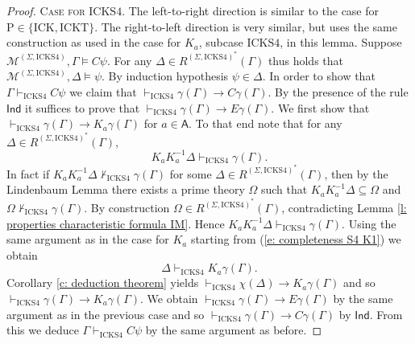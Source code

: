 \documentclass{myifcolog}
\newcommand\C {C}
\newcommand{\K}{K}
\newcommand\A{\mathsf{A}}
\newcommand{\agi}{a}
\newcommand{\E}{E}
\newcommand{\fw}{\mathcal{M}}
\newcommand{\hick}{\mathrm{ICK}}
\newcommand{\hickt}{\mathrm{ICKT}}
\newcommand{\hicks}{\mathrm{ICKS4}}
\newcommand{\hickp}{\mathrm{P}}
\numberwithin{theorem}{section}
\begin{document}
\begin{proof}
   \noindent \textsc{Case for $\hicks$.} The left-to-right direction is similar to the case for $\hickp \in \{\hick, \hickt\}$. The right-to-left direction is very similar, but uses the same construction as used in the case for $\K_\agi$, subcase $\hicks$, in this lemma. Suppose $\fw^{(\Sigma, \hicks)}, \Gamma \models \C \psi$. For any $\Delta \in R^{(\Sigma, \hicks)^*}(\Gamma)$ thus holds that $\fw^{(\Sigma, \hicks)}, \Delta \models \psi$. By induction hypothesis $\psi \in \Delta$. In order to show that $\Gamma \vdash_\hicks \C \psi$ we claim that $\vdash_\hicks \gamma(\Gamma) \rightarrow \C \gamma(\Gamma)$. By the presence of the rule $\mathsf{Ind}$ it suffices to prove that $\vdash_\hicks \gamma(\Gamma) \rightarrow \E \gamma(\Gamma)$. We first show that $\vdash_\hicks \gamma(\Gamma) \rightarrow \K_\agi \gamma(\Gamma)$ for $\agi \in \A$. To that end note that for any $\Delta \in R^{(\Sigma, \hicks)^*}(\Gamma)$,
 \begin{equation*}
     \K_\agi \K_\agi^{-1} \Delta \vdash_\hicks \gamma(\Gamma).
 \end{equation*}
 In fact if $\K_\agi \K_\agi^{-1} \Delta \not \vdash_\hicks \gamma(\Gamma)$ for some $\Delta \in R^{(\Sigma, \hicks)^*}(\Gamma)$, then by the Lindenbaum Lemma there exists a prime theory $\Omega$ such that $\K_\agi \K_\agi^{-1} \Delta \subseteq \Omega$ and $\Omega \not \vdash_\hicks \gamma(\Gamma)$. By construction $\Omega \in R^{(\Sigma, \hicks)^*}(\Gamma)$, contradicting Lemma \ref{l: properties characteristic formula IM}. Hence $ \K_\agi \K_\agi^{-1} \Delta \vdash_\hicks \gamma(\Gamma)$. Using the same argument as in the case for $\K_\agi$ starting from (\ref{e: completeness S4 K1}) we obtain
 \begin{equation*}\label{e: completeness S4 C1}
     \Delta \vdash_\hicks \K_\agi \gamma(\Gamma).
 \end{equation*}
 Corollary \ref{c: deduction theorem} yields $\vdash_\hicks \chi(\Delta) \rightarrow \K_\agi \gamma(\Gamma)$ and so $\vdash_\hicks \gamma(\Gamma) \rightarrow \K_\agi \gamma(\Gamma)$. We obtain $\vdash_\hicks \gamma(\Gamma) \rightarrow \E \gamma(\Gamma)$ by the same argument as in the previous case and so $\vdash_\hicks \gamma(\Gamma) \rightarrow \C \gamma(\Gamma)$ by $\mathsf{Ind}$. From this we deduce $\Gamma \vdash_\hicks \C \psi$ by the same argument as before. \smallskip


\end{proof}
\end{document}
